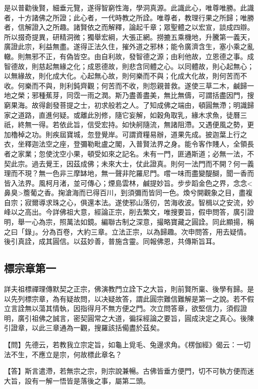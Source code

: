 是以普勸後賢，細垂元覽，遂得智窮性海，學洞真源。此識此心，唯尊唯勝。此識者，十方諸佛之所證；此心者，一代時教之所詮。唯尊者，教理行果之所歸；唯勝者，信解證入之所趣。諸賢依之而解釋，論起千章；眾聖體之以宏宣，談成四辯。所以掇奇提異，研精洞微；獨舉宏綱，大張正網。撈摝五乘機地，升騰第一義天，廣證此宗，利益無盡。遂得正法久住，摧外道之邪林；能令廣濟含生，塞小乘之亂轍。則無邪不正，有偽皆空。由自利故，發智德之源；由利他故，立恩德之事。成智德故，則慈起無緣之化；成恩德故，則悲含同體之心。以同體故，則心起無心；以無緣故，則化成大化。心起無心故，則何樂而不與；化成大化故，則何苦而不收。何樂而不與，則利鈍齊觀；何苦而不收，則怨親普救。遂使三草二木，鹹歸一地之榮；邪種蕉芽，同霑一雨之潤。斯乃盡善盡美，無比無儔，可謂括盡因門，搜窮果海。故得創發菩提之士，初求般若之人。了知成佛之端由，頓圓無滯；明識歸家之道路，直進何疑。或離此別修，隨它妄解，如穀角取乳，緣木求魚，徒曆三祇，終無一得。若依此旨，信受宏持。如快舸隨流，無諸阻滯。又遇便風之勢，更加櫓棹之功。則疾屆寶城，忽登覺岸。可謂資糧易辦，道果先成。披迦葉上行之衣，坐釋迦法空之座，登彌勒毗盧之閣，入普賢法界之身。能令客作賤人，全領長者之家業；忽使沈空小果，頓受如來之記名。未有一門，匪通斯道；必無一法，不契此宗。過去覺王，因茲成佛；未來大士，仗此證真。則何一法門而不開？何一義理而不現？無一色非三摩缽地，無一聲非陀羅尼門。嚐一味而盡變醍醐，聞一香而皆入法界。風柯月渚，並可傳心；煙島雲林，鹹提妙旨。步步蹈金色之界，念念<鼻臭>簷葡之香。掬滄海而已得百川，到須彌而皆同一色。煥兮開觀象之目，盡複自宗；寂爾導求珠之心，俱還本法。遂使邪山落仞，苦海收波。智楫以之安流，妙峰以之高出。今詳佛祖大意，經論正宗，削去繁文，唯搜要旨，假申問答，廣引證明，舉一心為宗，照萬法如鏡。編聯古制之深意，撮略寶藏之圓詮。同此顯揚，稱之曰「錄」。分為百卷，大約三章。立法正宗，以為歸趣。次申問答，用去疑情。後引真詮，成其圓信。以茲妙善，普施含靈。同報佛恩，共傳斯旨耳。

\subsection{ 標宗章第一 }

詳夫祖標禪理傳默契之正宗，佛演教門立詮下之大旨，則前賢所稟、後學有歸。是以先列標宗章，為有疑故問，以决疑故答，謂此圓宗難信難解是第一之說。若不假立言詮無以蕩其情執，因指得月不無方便之門。次立問答章，欲堅信力，須假證明，廣引祖佛之誠言，密契圓常之大道，徧採經論之要旨，圓成決定之真心。後陳引證章，以此三章通為一觀，搜羅該括僃盡於茲矣。

【問】先德云，若教我立宗定旨，如龜上覓毛、兔邊求角。《楞伽經》偈云：{\kaishu 一切法不生，不應立是宗}，何故標此章名？

【答】斯言遣滯，若無宗之宗，則宗說兼暢。古佛皆垂方便門，切不可執方便而迷大旨，設有一解一悟皆是落後之事，屬第二頭。

